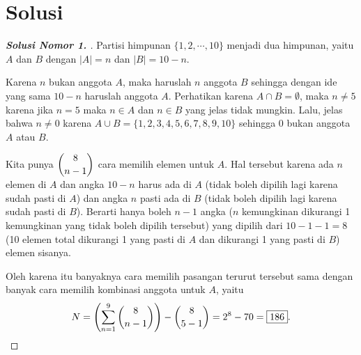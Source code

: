 \documentclass[12pt]{scrartcl}
\begin{document}
\newpage
\section{Solusi}
\begin{proof}[\textbf{Solusi Nomor 1. }]
Partisi himpunan $\{1,2,\cdots,10\}$ menjadi dua himpunan, yaitu $A$ dan $B$ dengan $|A|=n$ dan $|B|=10-n$.

Karena $n$ bukan anggota $A$, maka haruslah $n$ anggota $B$ sehingga dengan ide yang sama $10-n$ haruslah anggota $A$. Perhatikan karena $A \cap B = \emptyset$, maka $n \neq 5$ karena jika $n=5$ maka $n \in A$ dan $n \in B$ yang jelas tidak mungkin. Lalu, jelas bahwa $n \neq 0$ karena $A \cup B = \{1,2,3,4,5,6,7,8,9,10\}$ sehingga 0 bukan anggota $A$ atau $B$.

Kita punya $\dbinom{8}{n-1}$ cara memilih elemen untuk $A$. Hal tersebut karena ada $n$ elemen di $A$ dan angka $10-n$ harus ada di $A$ (tidak boleh dipilih lagi karena sudah pasti di $A$) dan angka $n$ pasti ada di $B$ (tidak boleh dipilih lagi karena sudah pasti di $B$). Berarti hanya boleh $n-1$ angka ($n$ kemungkinan dikurangi 1 kemungkinan yang tidak boleh dipilih tersebut) yang dipilih dari $10-1-1=8$ (10 elemen total dikurangi 1 yang pasti di $A$ dan dikurangi 1 yang pasti di $B$) elemen sisanya.

Oleh karena itu banyaknya cara memilih pasangan terurut tersebut sama dengan banyak cara memilih kombinasi anggota untuk $A$, yaitu $$N=\left(\sum_{n=1}^{9} \dbinom{8}{n-1}\right) - \dbinom{8}{5-1}=2^{8}-70= \boxed{186}.$$

\end{proof}
\end{document}
